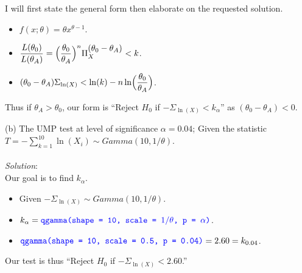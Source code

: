 \documentclass[12pt]{article}
\newcommand{\XBB}{\color{blue}}
\newcommand{\ds}{\displaystyle}
\begin{document}
\noindent
I will first state the general form then elaborate on the requested solution. \\

\begin{itemize}
    \item $ \ds f(x; \theta) = \theta x^{\theta - 1} $.
    \item $ \ds \frac{L(\theta_{0})}{L(\theta_{A})} = \Bigl( \frac{\theta_{0}}{\theta_{A}} \Bigr)^{n} \Pi_{X}^{\ds (\theta_{0} - \theta_{A})} < k $.
    \item $ \ds (\theta_{0} - \theta_{A}) \Sigma_{\ln(X)} < \ln(k) - n\ln\Bigl( \frac{\theta_{0}}{\theta_{A}} \Bigr) $.
\end{itemize}

\noindent
Thus if $ \theta_{A} > \theta_{0} $, our form is  ``Reject $ H_{0} $ if $ -\Sigma_{\ln(X)} < k_{\alpha} $'' as $ (\theta_{0} - \theta_{A}) < 0 $. \\

\vspace{2.5mm}

(b) The UMP test at level of significance $ \alpha = 0.04 $; Given the statistic $ \ds T = - \sum_{k=1}^{10} \ln(X_{i}) \sim Gamma(10, 1/\theta) $. \\
\vspace{2.5mm} \\
\textit{Solution}:
\vspace{2.5mm} \\

\noindent
Our goal is to find $ k_{\alpha} $. \\

\begin{itemize}
    \item Given $\ds -\Sigma_{\ln(X)} \sim Gamma(10, 1/\theta) $.
    \item $ \ds k_{\alpha} = {\XBB \texttt{qgamma(shape = 10, scale = $ 1 / \theta $, p = $ \alpha $)}} $.
    \item $ \ds {\XBB \texttt{qgamma(shape = 10, scale = 0.5, p = 0.04)}} = 2.60 = k_{0.04} $.
\end{itemize}

\noindent
Our test is thus ``Reject $ H_{0} $ if $ -\Sigma_{\ln(X)} < 2.60 $.'' \\

\vspace{2.5mm}

\newpage
\end{document}
